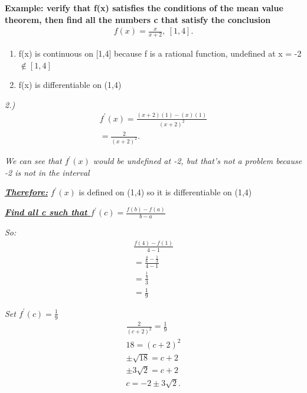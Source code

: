 \documentclass{report}
\begin{document}
   \bigbreak \noindent 
   \begin{mdframed}
     \textbf{Example: verify that f(x) satisfies the conditions of the mean value theorem, then 
       find all the numbers c that satisfy the conclusion
     }
     \begin{align*}
       f(x) = \frac{x}{x+2},\ [1,4]
     .\end{align*}
   \end{mdframed}

   \bigbreak \noindent 
   \begin{enumerate}
     \item f(x) is continuous on [1,4] because f is a rational function, undefined at x = -2 $\notin [1,4]$
      \item f(x) is differentiable on (1,4)
   \end{enumerate}

   \bigbreak \noindent 
   \textit{2.)}
   \begin{align*}
     f^{\prime}(x) = \frac{(x+2)(1) - (x)(1)}{(x+2)^{2}} \\
     = \frac{2}{(x+2)^{2}}
   .\end{align*}

   \bigbreak \noindent 
   \textit{We can see that $f^{\prime}(x)$ would be undefined at -2, but that's not a problem because -2 is not in the interval}

   \bigbreak \noindent 
   \textbf{\textit{\underline{Therefore:}}} $f^{\prime}(x)$ is defined on (1,4) so it is differentiable on (1,4)

   \bigbreak \noindent 
   \textbf{\textit{\underline{Find all c such that $f^{\prime}(c) = \frac{f(b) - f(a)}{b-a}$}}}

   \bigbreak \noindent
   \textit{So:}
   \begin{align*}
    \frac{f(4) - f(1)}{4-1} \\
    = \frac{\frac{4}{6} - \frac{1}{3}}{4-1} \\
    = \frac{\frac{1}{3}}{3} \\ 
    = \frac{1}{9}
   \end{align*}

   \bigbreak \noindent 
   \textit{Set $f^{\prime}(c) = \frac{1}{9}$}
   \begin{align*}
     \frac{2}{(c+2)^{2}} = \frac{1}{9} \\
     18 = (c+2)^{2} \\ 
     \pm \sqrt{18} = c+2 \\ 
      \pm 3\sqrt{2} = c + 2 \\
      c = -2 \pm 3\sqrt{2}
   .\end{align*}
   
\end{document}
